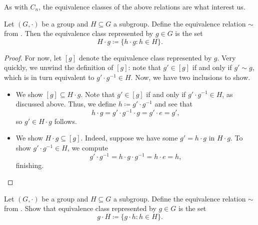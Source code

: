 \documentclass[../main.tex]{subfiles}
\begin{document}
As with $C_n$, the equivalence classes of the above relations are what interest us.
\begin{lemma}
    Let $(G,\cdot)$ be a group and $H\subseteq G$ a subgroup. Define the equivalence relation $\sim$ from . Then the equivalence class represented by $g\in G$ is the set
    \[H\cdot g\coloneqq\{h\cdot g:h\in H\}.\]
\end{lemma}
\begin{proof}
    For now, let $[g]$ denote the equivalence class represented by $g$. Very quickly, we unwind the definition of $[g]$: note that $g'\in[g]$ if and only if $g'\sim g$, which is in turn equivalent to $g'\cdot g^{-1}\in H$. Now, we have two inclusions to show.
    \begin{itemize}
        \item We show $[g]\subseteq H\cdot g$. Note that $g'\in[g]$ if and only if $g'\cdot g^{-1}\in H$, as discussed above. Thus, we define $h\coloneqq g'\cdot g^{-1}$ and see that
        \[h\cdot g=g'\cdot g^{-1}\cdot g=g'\cdot e=g',\]
        so $g'\in H\cdot g$ follows.
        \item We show $H\cdot g\subseteq[g]$. Indeed, suppose we have some $g'=h\cdot g$ in $H\cdot g$. To show $g'\cdot g^{-1}\in H$, we compute
        \[g'\cdot g^{-1}=h\cdot g\cdot g^{-1}=h\cdot e=h,\]
        finishing.
        \qedhere
    \end{itemize}
\end{proof}
\begin{exe} \label{exe:define-left-coset}
    Let $(G,\cdot)$ be a group and $H\subseteq G$ a subgroup. Define the equivalence relation $\sim$ from . Show that equivalence class represented by $g\in G$ is the set
    \[g\cdot H\coloneqq\{g\cdot h:h\in H\}.\]
\end{exe}
\end{document}
